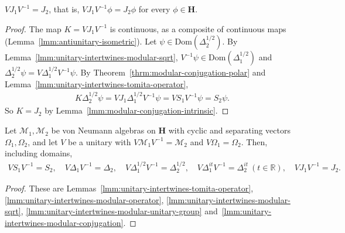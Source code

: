 \begin{lemma}
    \label{lmm:unitary-intertwines-modular-conjugation}
    \leanok
    $VJ_1V^{-1} = J_2$, that is, $VJ_1V^{-1}\phi = J_2\phi$ for every $\phi \in \mathbf{H}$.
\end{lemma}
\begin{proof}
    \leanok
    The map $K = VJ_1V^{-1}$ is continuous, as a composite of continuous maps (Lemma~\ref{lmm:antiunitary-isometric}). Let $\psi \in \text{Dom}(\Delta_2^{1/2})$. By Lemma~\ref{lmm:unitary-intertwines-modular-sqrt}, $V^{-1}\psi \in \text{Dom}(\Delta_1^{1/2})$ and $\Delta_2^{1/2}\psi = V\Delta_1^{1/2}V^{-1}\psi$. By Theorem~\ref{thrm:modular-conjugation-polar} and Lemma~\ref{lmm:unitary-intertwines-tomita-operator},
    \begin{align}
        K\Delta_2^{1/2}\psi = VJ_1\Delta_1^{1/2}V^{-1}\psi = VS_1V^{-1}\psi = S_2\psi.
    \end{align}
    So $K = J_2$ by Lemma~\ref{lmm:modular-conjugation-intrinsic}.
\end{proof}

\begin{theorem}
    \label{thrm:unitary-intertwines-modular-objects}
    \leanok
    Let $\mathcal{M}_1, \mathcal{M}_2$ be von Neumann algebras on $\mathbf{H}$ with cyclic and separating vectors $\Omega_1, \Omega_2$, and let $V$ be a unitary with $V\mathcal{M}_1V^{-1} = \mathcal{M}_2$ and $V\Omega_1 = \Omega_2$. Then, including domains,
    \begin{align}
        VS_1V^{-1} = S_2, \quad V\Delta_1V^{-1} = \Delta_2, \quad V\Delta_1^{1/2}V^{-1} = \Delta_2^{1/2}, \quad V\Delta_1^{it}V^{-1} = \Delta_2^{it} \ (t \in \mathbb{R}), \quad VJ_1V^{-1} = J_2.
    \end{align}
\end{theorem}
\begin{proof}
    \leanok
    These are Lemmas~\ref{lmm:unitary-intertwines-tomita-operator}, \ref{lmm:unitary-intertwines-modular-operator}, \ref{lmm:unitary-intertwines-modular-sqrt}, \ref{lmm:unitary-intertwines-modular-unitary-group} and~\ref{lmm:unitary-intertwines-modular-conjugation}.
\end{proof}

